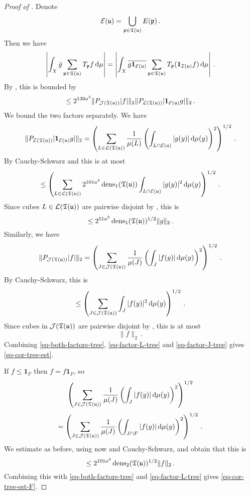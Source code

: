 \begin{proof}[Proof of ]
    Denote
    $$
        \mathcal{E}({\mathfrak u}) = \bigcup_{{\mathfrak p} \in {\mathfrak T}({\mathfrak u})} E({\mathfrak p})\,.
    $$
    Then we have
    $$
        \left| \int_X \bar g \sum_{{\mathfrak p} \in {\mathfrak T}({\mathfrak u})} T_{{\mathfrak p}} f \, \mathrm{d}\mu \right| = \left| \int_X \overline{ g\mathbf{1}_{\mathcal{E}({\mathfrak u})}} \sum_{{\mathfrak p} \in {\mathfrak T}({\mathfrak u})} T_{{\mathfrak p}} (\mathbf{1}_{{\mathcal{I}}({\mathfrak u})}f) \, \mathrm{d}\mu \right|\,.
    $$
    By , this is bounded by
    \begin{equation}
        \label{eq-both-factors-tree}
        \le 2^{130a^3}\|P_{\mathcal{J}({\mathfrak T}({\mathfrak u}))}|f|\|_2 \|P_{\mathcal{L}({\mathfrak T}({\mathfrak u}))} |\mathbf{1}_{\mathcal{E}({\mathfrak u})}g|\|_2\,.
    \end{equation}
    We bound the two factors separately.
    We have
    $$
        \|P_{\mathcal{L}({\mathfrak T}({\mathfrak u}))} |\mathbf{1}_{\mathcal{E}({\mathfrak u})}g|\|_2 = \left( \sum_{L \in \mathcal{L}({\mathfrak T}({\mathfrak u}))} \frac{1}{\mu(L)} \left(\int_{L \cap \mathcal{E}({\mathfrak u})} |g(y)| \, \mathrm{d}\mu(y)\right)^2 \right)^{1/2}\,.
    $$
    By Cauchy-Schwarz and  this is at most
    $$
        \le \left( \sum_{L \in \mathcal{L}({\mathfrak T}({\mathfrak u}))} 2^{101a^3} \operatorname{\operatorname{dens}}_1({\mathfrak T}({\mathfrak u})) \int_{L \cap \mathcal{E}({\mathfrak u})} |g(y)|^2 \, \mathrm{d}\mu(y) \right)^{1/2}\,.
    $$
    Since cubes $L \in \mathcal{L}({\mathfrak T}({\mathfrak u}))$ are pairwise disjoint by , this is
    \begin{equation}
        \label{eq-factor-L-tree}
         \le 2^{51 a^3} \operatorname{\operatorname{dens}}_1({\mathfrak T}({\mathfrak u}))^{1/2} \|g\|_2\,.
    \end{equation}
    Similarly, we have
    \begin{equation}
        \label{eq-cor-tree-proof}
        \|P_{\mathcal{J}({\mathfrak T}({\mathfrak u}))}|f|\|_2 = \left( \sum_{J \in \mathcal{J}({\mathfrak T}({\mathfrak u}))} \frac{1}{\mu(J)} \left(\int_J |f(y)| \, \mathrm{d}\mu(y)\right)^2 \right)^{1/2}\,.
    \end{equation}
    By Cauchy-Schwarz, this is
    $$
        \le \left( \sum_{J \in \mathcal{J}({\mathfrak T}({\mathfrak u}))} \int_J |f(y)|^2 \, \mathrm{d}\mu(y) \right)^{1/2}\,.
    $$
    Since cubes in $\mathcal{J}({\mathfrak T}({\mathfrak u}))$ are pairwise disjoint by , this is at most
    \begin{equation}
        \label{eq-factor-J-tree}
        \|f\|_2\,.
    \end{equation}
    Combining \eqref{eq-both-factors-tree}, \eqref{eq-factor-L-tree} and \eqref{eq-factor-J-tree} gives \eqref{eq-cor-tree-est}.

    If $f \le \mathbf{1}_F$ then $f = f\mathbf{1}_F$, so
    $$
        \left( \sum_{J \in \mathcal{J}({\mathfrak T}({\mathfrak u}))} \frac{1}{\mu(J)} \left(\int_J |f(y)| \, \mathrm{d}\mu(y)\right)^2 \right)^{1/2}
    $$
    $$
        =\left(\sum_{J \in \mathcal{J}({\mathfrak T}({\mathfrak u}))} \frac{1}{\mu(J)} \left(\int_{J \cap F} |f(y)| \, \mathrm{d}\mu(y)\right)^2 \right)^{1/2}\,.
    $$
    We estimate as before, using now  and Cauchy-Schwarz, and obtain that this is
    $$
        \le 2^{101a^3} \operatorname{\operatorname{dens}}_2({\mathfrak T}({\mathfrak u}))^{1/2} \|f\|_2\,.
    $$
    Combining this with \eqref{eq-both-factors-tree} and \eqref{eq-factor-L-tree} gives \eqref{eq-cor-tree-est-F}.
\end{proof}

